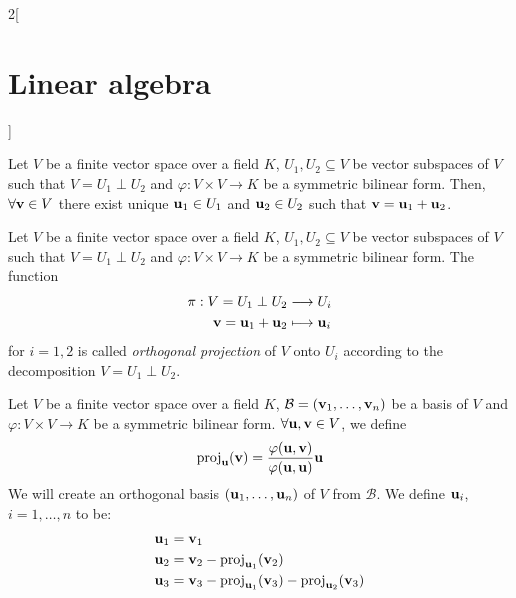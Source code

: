 \documentclass[../../../main.tex]{subfiles}
\begin{document}
\begin{multicols}{2}[\section{Linear algebra}]
\begin{definition}
  \end{definition}
  \begin{prop}
    Let $V$ be a finite vector space over a field $K$, $U_1,U_2\subseteq V$ be vector subspaces of $V$ such that $V=U_1\perp U_2$ and $\varphi:V\times V\rightarrow K$ be a symmetric bilinear form. Then, $\forall \boldsymbol{\mathrm{v}}\in V$ there exist unique $\boldsymbol{\mathrm{u}}_1\in U_1$ and $\boldsymbol{\mathrm{u}}_2\in U_2$ such that $\boldsymbol{\mathrm{v}}=\boldsymbol{\mathrm{u}}_1+\boldsymbol{\mathrm{u}}_2$.
  \end{prop}
  \begin{definition}\label{LA_perpendicular}
    Let $V$ be a finite vector space over a field $K$, $U_1,U_2\subseteq V$ be vector subspaces of $V$ such that $V=U_1\perp U_2$ and $\varphi:V\times V\rightarrow K$ be a symmetric bilinear form. The function
    \begin{align*}
      \pi:V=U_1\perp U_2                                           & \longrightarrow U_i              \\
      \boldsymbol{\mathrm{v}}=\boldsymbol{\mathrm{u}}_1+\boldsymbol{\mathrm{u}}_2 & \longmapsto \boldsymbol{\mathrm{u}}_i
    \end{align*}
    for $i=1,2$ is called \emph{orthogonal projection} of $V$ onto $U_i$ according to the decomposition $V=U_1\perp U_2$.
  \end{definition}
  \begin{method}
    Let $V$ be a finite vector space over a field $K$, $\mathcal{B}=(\boldsymbol{\mathrm{v}}_1,\ldots,\boldsymbol{\mathrm{v}}_n)$ be a basis of $V$ and $\varphi:V\times V\rightarrow K$ be a symmetric bilinear form. $\forall\boldsymbol{\mathrm{u}},\boldsymbol{\mathrm{v}}\in V$, we define $$\text{proj}_{\boldsymbol{\mathrm{u}}}(\boldsymbol{\mathrm{v}})=\frac{\varphi(\boldsymbol{\mathrm{u}},\boldsymbol{\mathrm{v}})}{\varphi(\boldsymbol{\mathrm{u}},\boldsymbol{\mathrm{u}})}\boldsymbol{\mathrm{u}}$$ We will create an orthogonal basis $(\boldsymbol{\mathrm{u}}_1,\ldots,\boldsymbol{\mathrm{u}}_n)$ of $V$ from $\mathcal{B}$. We define $\boldsymbol{\mathrm{u}}_i$, $i=1,\ldots,n$ to be:
    \begin{align*}
      \vectorfunction{u}_1 & =\vectorfunction{v}_1                                                                                                                   \\
      \vectorfunction{u}_2 & =\vectorfunction{v}_2-\text{proj}_{\vectorfunction{u}_1}(\vectorfunction{v}_2)                                                          \\
      \vectorfunction{u}_3 & =\vectorfunction{v}_3-\text{proj}_{\vectorfunction{u}_1}(\vectorfunction{v}_3)-\text{proj}_{\vectorfunction{u}_2}(\vectorfunction{v}_3) \\

\end{align*}
\end{method}
\end{multicols}
\end{document}
